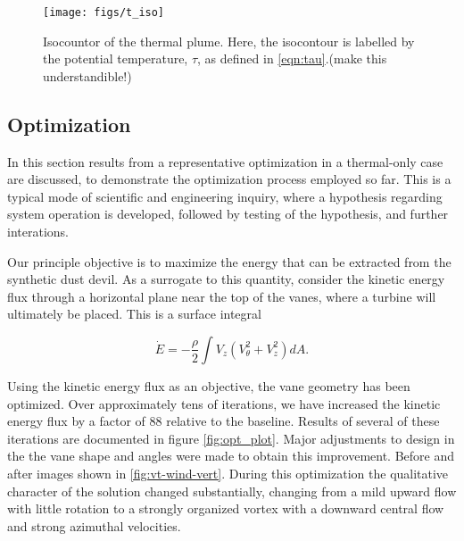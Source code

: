 %
%
  \begin{figure}[!htb]
   \begin{center}
    \texttt{[image: figs/t\_iso]}
    \caption{Isocountor of the thermal plume. Here, the isocontour is
    labelled by the potential temperature, $\tau$, as defined in \ref{eqn:tau}.(make this understandible!)}
    \label{fig:field_real}
   \end{center}
  \end{figure}

\subsection{Optimization}

In this section results from a representative optimization
in a thermal-only case are discussed, to demonstrate the optimization 
process employed so far. 
This is a typical mode of
scientific and engineering inquiry, where a hypothesis regarding system
operation is developed, followed by testing of the hypothesis, and
further interations. 

Our principle objective is to maximize the energy that can be 
extracted from the synthetic dust devil. As a surrogate to this quantity,
consider the kinetic energy flux through a horizontal plane near the top of the vanes,
where a turbine will ultimately be placed. This is a
surface integral\cite{landau1959fm}


 \begin{equation}
 \dot E = -\frac{\rho }{2} \int V_z (V_{\theta}^2 + V_z^2 ) dA.
 \end{equation}

Using the kinetic energy flux as an objective, 
the vane geometry has been optimized. Over approximately 
tens of iterations, we have increased the kinetic energy flux by 
a factor of 88 relative to the baseline.
Results of several of these iterations are documented in 
figure \ref{fig:opt_plot}. Major adjustments 
to design in the the vane shape and angles were made to obtain this improvement. 
Before and after images shown in \ref{fig:vt-wind-vert}. 
During this optimization the qualitative character 
of the solution changed substantially, changing from a mild upward flow with little rotation
to a strongly organized vortex with a downward central flow and strong azimuthal velocities. 

